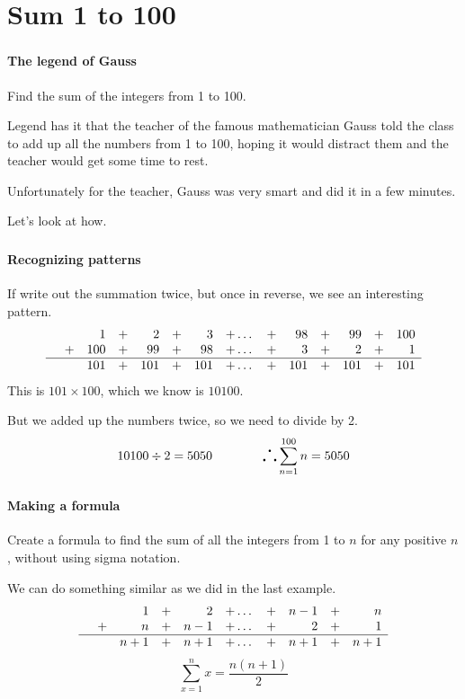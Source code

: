 \documentclass[mathserif]{beamer}
\begin{document}
	\section{Sum 1 to 100}
	\begin{frame}
		\frametitle{\secname}
		\framesubtitle{The legend of Gauss}
		\begin{example}
			Find the sum of the integers from 1 to 100.
		\end{example}
		Legend has it that the teacher of the famous mathematician Gauss told the class to add up all the numbers from 1 to 100, hoping it would distract them and the teacher would get some time to rest.

		Unfortunately for the teacher, Gauss was very smart and did it in a few minutes.

		Let's look at how.
	\end{frame}
	\begin{frame}
		\frametitle{\secname}
		\framesubtitle{Recognizing patterns}
		If write out the summation twice, but once in reverse, we see an interesting pattern.
		\begin{equation*}
			\begin{array}{lrrrrrrrrrrrrrrrrrrrrr}
				&    &1 &+  &2  &+  &3 &+  \dots &+ &98  &+ &99  &+ &100\\
				&+ &100 &+ &99  &+ &98 &+  \dots &+  &3  &+  &2  &+ &1\\\hline
				&  &101 &+ &101 &+ &101 &+ \dots &+ &101 &+ &101 &+ &101
			\end{array}
		\end{equation*}
		This is $101 \times 100$, which we know is $10100$.

		But we added up the numbers twice, so we need to divide by 2.
		\[10100 \div 2 = 5050 \qquad\qquad \text{\LARGE$\therefore$}\sum_{n=1}^{100}n = 5050\]
	\end{frame}
	\begin{frame}
		\frametitle{\secname}
		\framesubtitle{Making a formula}
		\begin{example}
			Create a formula to find the sum of all the integers from 1 to $n$ for any positive $n$, without using sigma notation.
		\end{example}
		\pause
		We can do something similar as we did in the last example.
		\pause
		\begin{equation*}
			\begin{array}{lrrrrrrrrrrrrrrrrrrrrr}
				&    &1 &+   &2 &+ \dots &+ &n-1 &+ &n\\
				&+   &n &+ &n-1 &+ \dots &+   &2 &+ &1\\\hline
				&  &n+1 &+ &n+1 &+ \dots &+ &n+1 &+ &n+1
			\end{array}
		\end{equation*}
		\pause
		\[\sum_{x=1}^{n}x = \frac{n(n+1)}{2}\]
	\end{frame}
\end{document}
